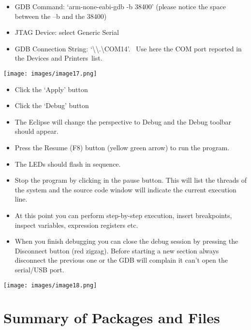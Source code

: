 \begin{itemize}
\tightlist
\item
  {GDB Command: `arm-none-eabi-gdb -b 38400' (please notice the space
  between the --b and the 38400)}
\item
  {JTAG Device: select Generic Serial}
\item
  {GDB Connection String:
  `\textbackslash{}\textbackslash{}.\textbackslash{}COM14'. ~Use here
  the COM port reported in the }{Devices and Printers}{~list.}
\end{itemize}

{\texttt{[image: images/image17.png]}}

\begin{itemize}
\tightlist
\item
  {Click the `Apply' button}
\item
  {Click the `Debug' button}
\item
  {The Eclipse will change the perspective to Debug and the Debug
  toolbar should appear.}
\item
  {Press the Resume (F8) button (yellow green arrow) to run the
  program.}
\item
  {The LEDs should flash in sequence.}
\item
  {Stop the program by clicking in the pause button. This will list the
  threads of the system and the source code window will indicate the
  current execution line.}
\item
  {At this point you can perform step-by-step execution, insert
  breakpoints, inspect variables, expression registers etc.}
\item
  {When you finish debugging you can close the debug session by pressing
  the Disconnect button (red zigzag). Before starting a new section
  always disconnect the previous one or the GDB will complain it can't
  open the serial/USB port.}
\end{itemize}

{\texttt{[image: images/image18.png]}}

\section{\texorpdfstring{{Summary of Packages and
Files}}{Summary of Packages and Files}}\label{summary-of-packages-and-files}

\protect\hypertarget{t.36dcbdc507fe00169c271aaebe6543bb601998bb}{}{}\protect\hypertarget{t.0}{}{}

